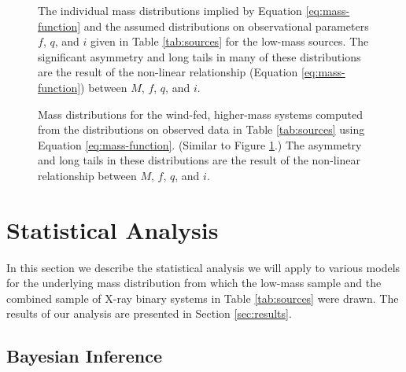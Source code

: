 \documentclass[preprint]{aastex}
\begin{document}
\begin{figure}
  \begin{center}
  \end{center}

  \caption{\label{fig:low-masses} The individual mass distributions
    implied by Equation \eqref{eq:mass-function} and the assumed
    distributions on observational parameters $f$, $q$, and $i$ given
    in Table \ref{tab:sources} for the low-mass sources.  The
    significant asymmetry and long tails in many of these
    distributions are the result of the non-linear relationship
    (Equation \eqref{eq:mass-function}) between $M$, $f$, $q$, and
    $i$.}
\end{figure}

\begin{figure}
  \begin{center}
  \end{center}
  \caption{\label{fig:high-masses} Mass distributions for the
    wind-fed, higher-mass systems computed from the distributions on
    observed data in Table \ref{tab:sources} using Equation
    \eqref{eq:mass-function}.  (Similar to Figure
    \ref{fig:low-masses}.)  The asymmetry and long tails in these
    distributions are the result of the non-linear relationship
    between $M$, $f$, $q$, and $i$.}
\end{figure}

\section{Statistical Analysis}
\label{sec:models}

In this section we describe the statistical analysis we will apply to
various models for the underlying mass distribution from which the
low-mass sample and the combined sample of X-ray binary systems in
Table \ref{tab:sources} were drawn.  The results of our analysis are
presented in Section \ref{sec:results}.

\subsection{Bayesian Inference}
\end{document}
